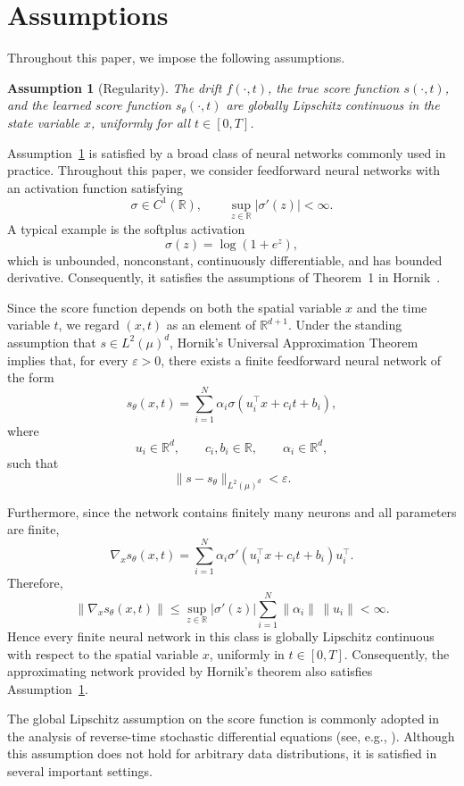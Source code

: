 \documentclass[11pt]{article}
\newtheorem{assumption}{Assumption}
\begin{document}
\section{Assumptions}

Throughout this paper, we impose the following assumptions.

\begin{assumption}[Regularity]
\label{ass:regularity}
The drift $f(\cdot,t)$, the true score function $s(\cdot,t)$, and the learned
score function $s_\theta(\cdot,t)$ are globally Lipschitz continuous in the
state variable $x$, uniformly for all $t\in[0,T]$.
\end{assumption}

Assumption~\ref{ass:regularity} is satisfied by a broad class of neural
networks commonly used in practice. Throughout this paper, we consider
feedforward neural networks with an activation function satisfying
\[
\sigma\in C^1(\mathbb R),
\qquad
\sup_{z\in\mathbb R}|\sigma'(z)|<\infty.
\]
A typical example is the softplus activation
\[
\sigma(z)=\log(1+e^z),
\]
which is unbounded, nonconstant, continuously differentiable, and has
bounded derivative. Consequently, it satisfies the assumptions of
Theorem~1 in Hornik~\cite{Hornik1991}.

Since the score function depends on both the spatial variable $x$ and the
time variable $t$, we regard $(x,t)$ as an element of
$\mathbb R^{d+1}$.
Under the standing assumption that
$s\in L^2(\mu)^d$, Hornik's Universal Approximation Theorem
\cite{Hornik1991} implies that, for every $\varepsilon>0$, there exists a
finite feedforward neural network of the form
\[
s_\theta(x,t)
=
\sum_{i=1}^{N}
\alpha_i
\sigma\!\left(u_i^\top x+c_i t+b_i\right),
\]
where
\[
u_i\in\mathbb R^d,\qquad
c_i,b_i\in\mathbb R,\qquad
\alpha_i\in\mathbb R^d,
\]
such that
\[
\|s-s_\theta\|_{L^2(\mu)^d}<\varepsilon.
\]

Furthermore, since the network contains finitely many neurons and all
parameters are finite,
\[
\nabla_x s_\theta(x,t)
=
\sum_{i=1}^{N}
\alpha_i
\sigma'\!\left(u_i^\top x+c_i t+b_i\right)
u_i^\top.
\]
Therefore,
\[
\|\nabla_x s_\theta(x,t)\|
\le
\sup_{z\in\mathbb R}|\sigma'(z)|
\sum_{i=1}^{N}
\|\alpha_i\|\,\|u_i\|
<
\infty.
\]
Hence every finite neural network in this class is globally Lipschitz
continuous with respect to the spatial variable $x$, uniformly in
$t\in[0,T]$. Consequently, the approximating network provided by
Hornik's theorem also satisfies Assumption~\ref{ass:regularity}.


The global Lipschitz assumption on the score function is commonly adopted in
the analysis of reverse-time stochastic differential equations (see, e.g.,
\cite{Anderson1982,haussmann1986time,karatzas1991}).
Although this assumption does not hold for arbitrary data distributions, it is
satisfied in several important settings.
\end{document}
